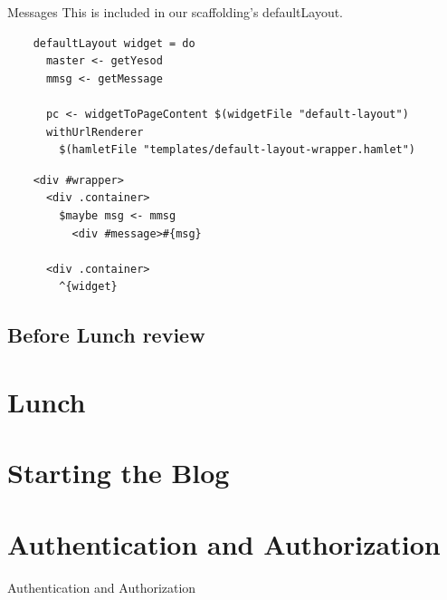 \documentclass[pdf]{beamer}
\begin{document}
\begin{frame}[fragile]{Messages}
  This is included in our scaffolding's defaultLayout. \\

  \begin{verbatim}
    defaultLayout widget = do
      master <- getYesod
      mmsg <- getMessage

      pc <- widgetToPageContent $(widgetFile "default-layout")
      withUrlRenderer
        $(hamletFile "templates/default-layout-wrapper.hamlet")
  \end{verbatim}
  \vspace{0.5em}
  \begin{verbatim}
    <div #wrapper>
      <div .container>
        $maybe msg <- mmsg
          <div #message>#{msg}

      <div .container>
        ^{widget}
  \end{verbatim}
\end{frame}

\subsection{Before Lunch review}

\section{Lunch}

\section{Starting the Blog}

\section{Authentication and Authorization}
\begin{frame}{Authentication and Authorization}
  
\end{frame}
\end{document}
